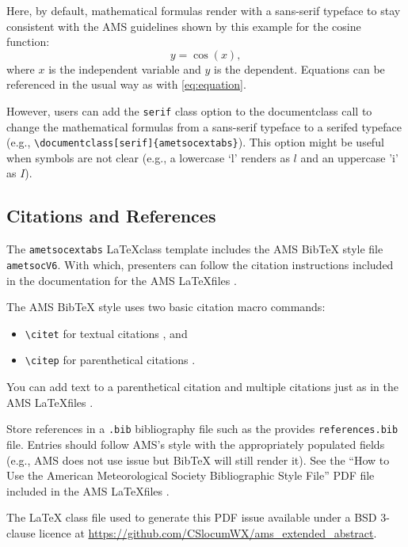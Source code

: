 \documentclass[9pt]{ametsocextabs}
\begin{document}
Here, by default, mathematical formulas render with a sans-serif
typeface to stay consistent with the AMS guidelines shown by this
example for the cosine function:
\begin{equation}
    y = \cos (x),
    \label{eq:equation}
\end{equation}
where $x$ is the independent variable and $y$ is the dependent.
Equations can be referenced in the usual way as with \eqref{eq:equation}.

However, users can add the \texttt{serif} class option to the
documentclass call to change the mathematical formulas from a
sans-serif typeface to a serifed typeface (e.g.,
\texttt{\textbackslash documentclass[serif]\{ametsocextabs\}}). This
option might be useful when symbols are not clear (e.g., a lowercase
`l' renders as $l$ and an uppercase 'i' as $I$).

\subsection{Citations and References}
The \lowercase{\texttt{ametsocextabs}} \LaTeX class template
includes the AMS BibTeX style file \texttt{ametsocV6}. With which,
presenters can follow the citation instructions included in the
documentation for the AMS \LaTeX files \cite{AMS2025latex, AMS2025doc}.

The AMS BibTeX style uses two basic citation macro commands:
\begin{itemize}
    \item \texttt{\textbackslash citet} for textual citations \rightarrow \citet{Eliassen1951}, and
    \item \texttt{\textbackslash citep} for parenthetical citations  \rightarrow \citep{Eliassen1951}.
\end{itemize}
You can add text to a parenthetical citation and multiple
citations just as in the AMS \LaTeX files
\citep[e.g.,][]{Eliassen1951,AMS2025latex, AMS2025doc}.

Store references in a \texttt{.bib} bibliography file such as the
provides \texttt{references.bib} file. Entries should follow AMS's
style with the appropriately populated fields (e.g., AMS does not
use issue but BibTeX will still render it). See the ``How to Use the
American Meteorological Society Bibliographic Style File'' PDF file
included in the AMS \LaTeX files \cite{AMS2025latex, AMS2025doc}.

%
\datastatement The LaTeX class file used to generate this PDF issue
available under a BSD 3-clause licence at
\url{https://github.com/CSlocumWX/ams_extended_abstract}.
\end{document}
